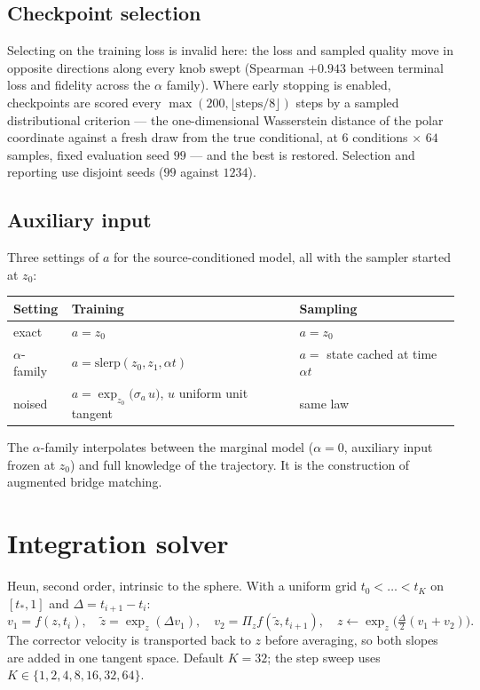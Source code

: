 \documentclass[11pt]{article}
\begin{document}
\subsection*{Checkpoint selection}

Selecting on the training loss is invalid here: the loss and sampled quality move in opposite
directions along every knob swept (Spearman $+0.943$ between terminal loss and fidelity across the
$\alpha$ family). Where early stopping is enabled, checkpoints are scored every
$\max(200,\lfloor\text{steps}/8\rfloor)$ steps by a sampled distributional criterion --- the
one-dimensional Wasserstein distance of the polar coordinate against a fresh draw from the true
conditional, at $6$ conditions $\times$ $64$ samples, fixed evaluation seed $99$ --- and the best
is restored. Selection and reporting use disjoint seeds ($99$ against $1234$).

\subsection*{Auxiliary input}
\label{sec:aux}

Three settings of $a$ for the source-conditioned model, all with the sampler started at $z_0$:
\begin{center}
\begin{tabular}{@{}lll@{}}
\toprule
Setting & Training & Sampling\\
\midrule
exact & $a=z_0$ & $a=z_0$\\
$\alpha$-family & $a=\mathrm{slerp}(z_0,z_1,\alpha t)$ & $a=$ state cached at time $\alpha t$\\
noised & $a=\exp_{z_0}\!\big(\sigma_a\,u\big)$, $u$ uniform unit tangent & same law\\
\bottomrule
\end{tabular}
\end{center}

The $\alpha$-family interpolates between the marginal model ($\alpha=0$, auxiliary input frozen at
$z_0$) and full knowledge of the trajectory. It is the construction of augmented bridge matching.

\section{Integration solver}

Heun, second order, intrinsic to the sphere. With a uniform grid $t_0<\dots<t_K$ on $[t_\ast,1]$
and $\Delta=t_{i+1}-t_i$:
\[
v_1=f(z,t_i),\quad
\tilde z=\exp_z(\Delta v_1),\quad
v_2=\Pi_z f(\tilde z,t_{i+1}),\quad
z\leftarrow\exp_z\!\big(\tfrac{\Delta}{2}(v_1+v_2)\big).
\]
The corrector velocity is transported back to $z$ before averaging, so both slopes are added in
one tangent space. Default $K=32$; the step sweep uses $K\in\{1,2,4,8,16,32,64\}$.
\end{document}
